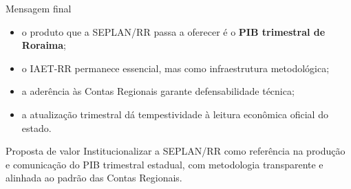 \documentclass[aspectratio=169,11pt]{beamer}
\begin{document}
\begin{frame}{Mensagem final}
\begin{itemize}
  \item o produto que a SEPLAN/RR passa a oferecer é o \textbf{PIB trimestral de Roraima};
  \item o IAET-RR permanece essencial, mas como infraestrutura metodológica;
  \item a aderência às Contas Regionais garante defensabilidade técnica;
  \item a atualização trimestral dá tempestividade à leitura econômica oficial do estado.
\end{itemize}

\vspace{0.4cm}
\begin{alertblock}{Proposta de valor}
Institucionalizar a SEPLAN/RR como referência na produção e comunicação do PIB trimestral estadual, com metodologia transparente e alinhada ao padrão das Contas Regionais.
\end{alertblock}
\end{frame}
\end{document}
